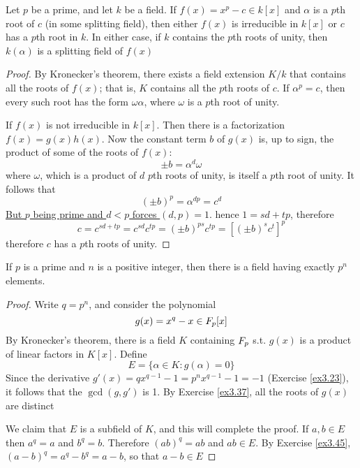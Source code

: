 \documentclass[11pt]{article}
\begin{document}
\begin{proposition}[]
\label{prop3.126}
Let \(p\) be a prime, and let \(k\) be a field. If \(f(x)=x^p-c\in k[x]\) and
\(\alpha\) is a \(p\)th root of \(c\) (in some splitting field), then either \(f(x)\) is
irreducible in \(k[x]\) or \(c\) has a \(p\)th root in \(k\). In either case, if
\(k\) contains the \(p\)th roots of unity, then \(k(\alpha)\) is a splitting field
of \(f(x)\)
\end{proposition}

\begin{proof}
By Kronecker's theorem, there exists a field extension \(K/k\) that contains
all the roots of \(f(x)\); that is, \(K\) contains all the \(p\)th roots of
\(c\). If \(\alpha^p=c\), then every such root has the form \(\omega\alpha\), where
\(\omega\) is a \(p\)th root of unity.

If \(f(x)\) is not irreducible in \(k[x]\). Then there is a factorization
\(f(x)=g(x)h(x)\). Now the constant term \(b\) of \(g(x)\) is, up to sign, the
product of some of the roots of \(f(x)\):
\begin{equation*}
\pm b=\alpha^d\omega
\end{equation*}
where \(\omega\), which is a product of \(d\) \(p\)th roots of unity, is itself a
\(p\)th root of unity. It follows that 
\begin{equation*}
(\pm b)^p=\alpha^{dp}=c^d
\end{equation*}
\uline{But \(p\) being prime and \(d<p\) forces \((d,p)=1\)}. hence \(1=sd+tp\),
therefore
\begin{equation*}
c=c^{sd+tp}=c^{sd}c^{tp}=(\pm b)^{ps}c^{tp}=[(\pm b)^sc^t]^p
\end{equation*}
therefore \(c\) has a \(p\)th roots of unity.
\end{proof}

\begin{theorem}[Galois]
\label{thm3.127}
If \(p\) is a prime and \(n\) is a positive integer, then there is a field having
exactly \(p^n\) elements.
\end{theorem}

\begin{proof}
Write \(q=p^n\), and consider the polynomial
\begin{equation*}
g(x)=x^q-x\in\relax{F}_p[x]
\end{equation*}
By Kronecker's theorem, there is a field \(K\) containing \(\relax{F}_p\) s.t. \(g(x)\) is
a product of linear factors in \(K[x]\). Define
\begin{equation*}
E=\{\alpha\in K:g(\alpha)=0\}
\end{equation*}
Since the derivative \(g'(x)=qx^{q-1}-1=p^nx^{q-1}-1=-1\) (Exercise
\ref{ex3.23}), it follows that the \(\gcd(g,g')\) is 1. By Exercise \ref{ex3.37},
all the roots of \(g(x)\) are distinct

We claim that \(E\) is a subfield of \(K\), and this will complete the proof.
If \(a,b\in E\) then \(a^q=a\) and \(b^q=b\). Therefore \((ab)^q=ab\) and
\(ab\in E\). By Exercise \ref{ex3.45}, \((a-b)^q=a^q-b^q=a-b\), so that
\(a-b\in E\)
\end{proof}
\end{document}

